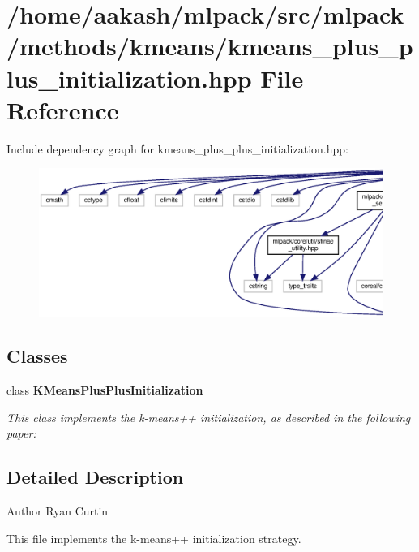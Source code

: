 \section{/home/aakash/mlpack/src/mlpack/methods/kmeans/kmeans\+\_\+plus\+\_\+plus\+\_\+initialization.hpp File Reference}
\label{kmeans__plus__plus__initialization_8hpp}
Include dependency graph for kmeans\+\_\+plus\+\_\+plus\+\_\+initialization.\+hpp\+:
\nopagebreak
\begin{figure}[H]
\begin{center}
\leavevmode
\includegraphics[width=350pt]{kmeans__plus__plus__initialization_8hpp__incl}
\end{center}
\end{figure}
\subsection*{Classes}
\begin{DoxyCompactItemize}
\item 
class \textbf{ K\+Means\+Plus\+Plus\+Initialization}
\begin{DoxyCompactList}\small\item\em This class implements the k-\/means++ initialization, as described in the following paper\+: \end{DoxyCompactList}\end{DoxyCompactItemize}


\subsection{Detailed Description}
\begin{DoxyAuthor}{Author}
Ryan Curtin
\end{DoxyAuthor}
This file implements the k-\/means++ initialization strategy. 